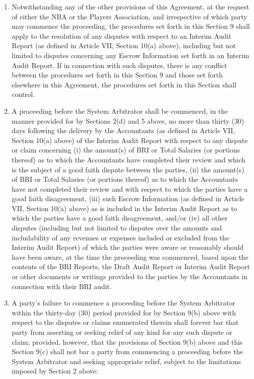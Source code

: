 \documentclass[
]{book}
\providecommand{\tightlist}{%
  \setlength{\itemsep}{0pt}\setlength{\parskip}{0pt}}
\begin{document}
\begin{enumerate}
\def\labelenumi{(\alph{enumi})}
\tightlist
\item
  Notwithstanding any of the other provisions of this Agreement, at the request of either the NBA or the Players Association, and irrespective of which party may commence the proceeding, the procedures set forth in this Section 9 shall apply to the resolution of any disputes with respect to an Interim Audit Report (as defined in Article VII, Section 10(a) above), including but not limited to disputes concerning any Escrow Information set forth in an Interim Audit Report. If in connection with such disputes, there is any conflict between the procedures set forth in this Section 9 and those set forth elsewhere in this Agreement, the procedures set forth in this Section shall control.
\item
  A proceeding before the System Arbitrator shall be commenced, in the manner provided for by Sections 2(d) and 5 above, no more than thirty (30) days following the delivery by the Accountants (as defined in Article VII, Section 10(a) above) of the Interim Audit Report with respect to any dispute or claim concerning (i) the amount(s) of BRI or Total Salaries (or portions thereof) as to which the Accountants have completed their review and which is the subject of a good faith dispute between the parties, (ii) the amount(s) of BRI or Total Salaries (or portions thereof) as to which the Accountants have not completed their review and with respect to which the parties have a good faith disagreement, (iii) such Escrow Information (as defined in Article VII, Section 10(a) above) as is included in the Interim Audit Report as to which the parties have a good faith disagreement, and/or (iv) all other disputes (including but not limited to disputes over the amounts and includability of any revenues or expenses included or excluded from the Interim Audit Report) of which the parties were aware or reasonably should have been aware, at the time the proceeding was commenced, based upon the contents of the BRI Reports, the Draft Audit Report or Interim Audit Report or other documents or writings provided to the parties by the Accountants in connection with their BRI audit.
\item
  A party's failure to commence a proceeding before the System Arbitrator within the thirty-day (30) period provided for by Section 9(b) above with respect to the disputes or claims enumerated therein shall forever bar that party from asserting or seeking relief of any kind for any such dispute or claim; provided, however, that the provisions of Section 9(b) above and this Section 9(c) shall not bar a party from commencing a proceeding before the System Arbitrator and seeking appropriate relief, subject to the limitations imposed by Section 2 above:


\end{enumerate}
\end{document}

